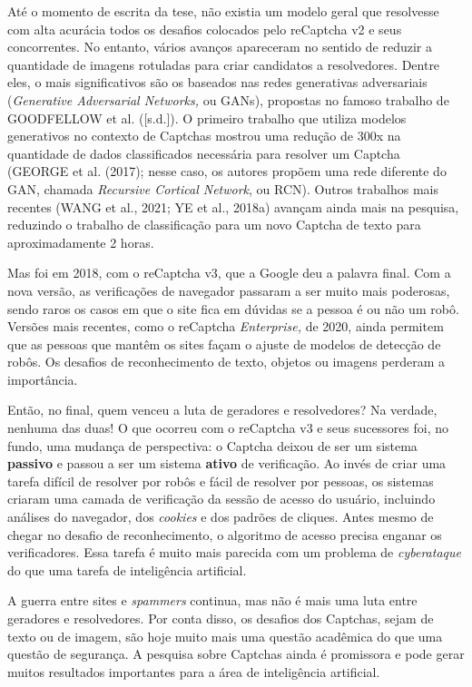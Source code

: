 \documentclass[12pt,twoside,brazilian]{book}
\begin{document}
Até o momento de escrita da tese, não existia um modelo geral que
resolvesse com alta acurácia todos os desafios colocados pelo reCaptcha
v2 e seus concorrentes. No entanto, vários avanços apareceram no sentido
de reduzir a quantidade de imagens rotuladas para criar candidatos a
resolvedores. Dentre eles, o mais significativos são os baseados nas
redes generativas adversariais (\emph{Generative Adversarial Networks,}
ou GANs), propostas no famoso trabalho de GOODFELLOW et al.
({[}s.d.{]}). O primeiro trabalho que utiliza modelos generativos no
contexto de Captchas mostrou uma redução de 300x na quantidade de dados
classificados necessária para resolver um Captcha (GEORGE et al. (2017);
nesse caso, os autores propõem uma rede diferente do GAN, chamada
\emph{Recursive Cortical Network}, ou RCN). Outros trabalhos mais
recentes (WANG et al., 2021; YE et al., 2018a) avançam ainda mais na
pesquisa, reduzindo o trabalho de classificação para um novo Captcha de
texto para aproximadamente 2 horas.

Mas foi em 2018, com o reCaptcha v3, que a Google deu a palavra final.
Com a nova versão, as verificações de navegador passaram a ser muito
mais poderosas, sendo raros os casos em que o site fica em dúvidas se a
pessoa é ou não um robô. Versões mais recentes, como o reCaptcha
\emph{Enterprise,} de 2020, ainda permitem que as pessoas que mantêm os
sites façam o ajuste de modelos de detecção de robôs. Os desafios de
reconhecimento de texto, objetos ou imagens perderam a importância.

Então, no final, quem venceu a luta de geradores e resolvedores? Na
verdade, nenhuma das duas! O que ocorreu com o reCaptcha v3 e seus
sucessores foi, no fundo, uma mudança de perspectiva: o Captcha deixou
de ser um sistema \textbf{passivo} e passou a ser um sistema
\textbf{ativo} de verificação. Ao invés de criar uma tarefa difícil de
resolver por robôs e fácil de resolver por pessoas, os sistemas criaram
uma camada de verificação da sessão de acesso do usuário, incluindo
análises do navegador, dos \emph{cookies} e dos padrões de cliques.
Antes mesmo de chegar no desafio de reconhecimento, o algoritmo de
acesso precisa enganar os verificadores. Essa tarefa é muito mais
parecida com um problema de \emph{cyberataque} do que uma tarefa de
inteligência artificial.

A guerra entre sites e \emph{spammers} continua, mas não é mais uma luta
entre geradores e resolvedores. Por conta disso, os desafios dos
Captchas, sejam de texto ou de imagem, são hoje muito mais uma questão
acadêmica do que uma questão de segurança. A pesquisa sobre Captchas
ainda é promissora e pode gerar muitos resultados importantes para a
área de inteligência artificial.
\end{document}
